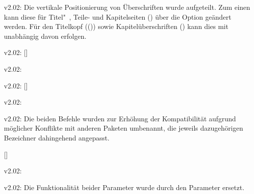 \begin{Obsolete}{v2.02:}
  {}
\printobsoletelist%
%
Die vertikale Positionierung von Überschriften wurde aufgeteilt. Zum einen kann 
diese für Titel"~, Teile- und Kapitelseiten () über 
die Option  geändert werden. Für den Titelkopf
(()) sowie Kapitelüberschriften 
() kann dies mit  
unabhängig davon erfolgen.
\end{Obsolete}

\begin{Obsolete}{v2.02:}
  {[]}
\begin{Obsolete}{v2.02:}
  {}
\begin{Obsolete}{v2.02:}
  {[]}
\begin{Obsolete}{v2.02:}
  {}
\begin{Obsolete}{v2.02:}
  {}
\printobsoletelist%
%
Die beiden Befehle wurden zur Erhöhung der Kompatibilität aufgrund möglicher 
Konflikte mit anderen Paketen umbenannt, die jeweils dazugehörigen Bezeichner 
dahingehend angepasst.
\end{Obsolete}
\end{Obsolete}
\end{Obsolete}
\end{Obsolete}
\end{Obsolete}

\begin{Obsolete}{}
  {[]}
\begin{Obsolete}{v2.02:}
  {}
\begin{Obsolete}{v2.02:}
  {}
\printobsoletelist%
%
Die Funktionalität beider Parameter wurde durch den Parameter 
 ersetzt.
\end{Obsolete}
\end{Obsolete}
\end{Obsolete}



